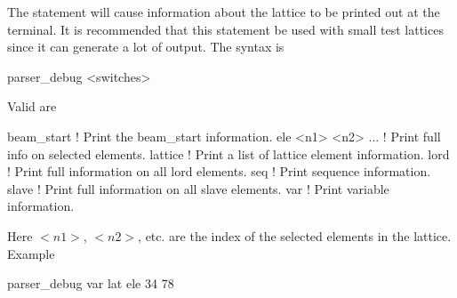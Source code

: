 The  statement will cause information about the
lattice to be printed out at the terminal. It is recommended that this
statement be used with small test lattices since it can generate a lot
of output. The syntax is
\begin{example}
  parser_debug <switches>
\end{example}
Valid  are
\begin{example}
  beam_start          ! Print the beam_start information.
  ele <n1> <n2> ...   ! Print full info on selected elements.
  lattice             ! Print a list of lattice element information.
  lord                ! Print full information on all lord elements.
  seq                 ! Print sequence information.
  slave               ! Print full information on all slave elements.
  var                 ! Print variable information.
\end{example}
Here $<n1>$, $<n2>$, etc. are the index of the selected elements in
the lattice.  Example
\begin{example}
  parser_debug var lat ele 34 78
\end{example}




